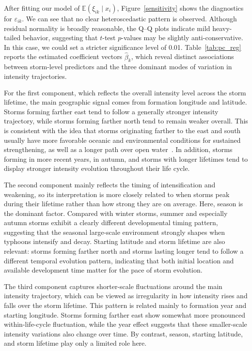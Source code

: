 \documentclass{article}
\begin{document}
After fitting our model of ${\mathbb{E}}(\xi_{ik}\mid x_i)$, Figure~\ref{sensitivity} shows the diagnostics for $\varepsilon_{ik}$. We can see that no clear heteroscedastic pattern is observed. Although residual normality is broadly reasonable, the Q--Q plots indicate mild heavy-tailed behavior, suggesting that $t$-test $p$-values may be slightly anti-conservative. In this case, we could set a stricter significance level of 0.01. Table~\ref{tab:pc_reg} reports the estimated coefficient vectors $\hat\beta_k$, which reveal distinct associations between storm-level predictors and the three dominant modes of variation in intensity trajectories.

For the first component, which reflects the overall intensity level across the storm lifetime, the main geographic signal comes from formation longitude and latitude. Storms forming farther east tend to follow a generally stronger intensity trajectory, while storms forming farther north tend to remain weaker overall. This is consistent with the idea that storms originating farther to the east and south usually have more favorable oceanic and environmental conditions for sustained strengthening, as well as a longer path over open water~\cite{zhan2017salient}. In addition, storms forming in more recent years, in autumn, and storms with longer lifetimes tend to display stronger intensity evolution throughout their life cycle.

The second component mainly reflects the timing of intensification and weakening, so its interpretation is more closely related to when storms peak during their lifetime rather than how strong they are on average. Here, season is the dominant factor. Compared with winter storms, summer and especially autumn storms exhibit a clearly different developmental timing pattern, suggesting that the seasonal large-scale environment strongly shapes when typhoons intensify and decay. Starting latitude and storm lifetime are also relevant: storms forming farther north and storms lasting longer tend to follow a different temporal evolution pattern, indicating that both initial location and available development time matter for the pace of storm evolution.

The third component captures shorter-scale fluctuations around the main intensity trajectory, which can be viewed as irregularity in how intensity rises and falls over the storm lifetime. This pattern is related mainly to formation year and starting longitude. Storms forming farther east show somewhat more pronounced within-life-cycle fluctuation, while the year effect suggests that these smaller-scale intensity variations also change over time. By contrast, season, starting latitude, and storm lifetime play only a limited role here.
\end{document}
